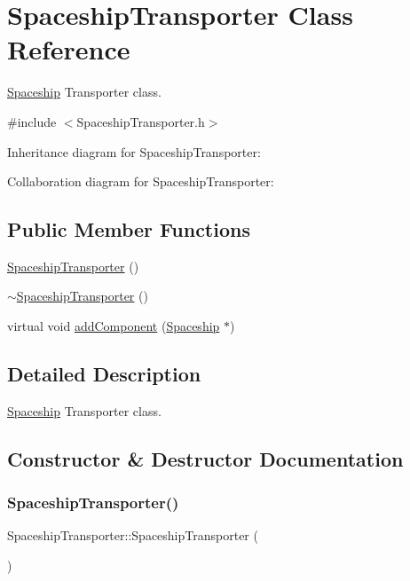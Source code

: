 \hypertarget{classSpaceshipTransporter}{}\section{Spaceship\+Transporter Class Reference}
\label{classSpaceshipTransporter}


\hyperlink{classSpaceship}{Spaceship} Transporter class.  




{\ttfamily \#include $<$Spaceship\+Transporter.\+h$>$}



Inheritance diagram for Spaceship\+Transporter\+:


Collaboration diagram for Spaceship\+Transporter\+:
\subsection*{Public Member Functions}
\begin{DoxyCompactItemize}
\item 
\hyperlink{classSpaceshipTransporter_a4478bc1ce68fb2306fb31849123b3eae}{Spaceship\+Transporter} ()
\item 
\hyperlink{classSpaceshipTransporter_a58a77ccda8effc3cfdb071c8ffa40929}{$\sim$\+Spaceship\+Transporter} ()
\item 
virtual void \hyperlink{classSpaceshipTransporter_a3e7646b5937a9967885cd3034a2f5637}{add\+Component} (\hyperlink{classSpaceship}{Spaceship} $\ast$)
\end{DoxyCompactItemize}


\subsection{Detailed Description}
\hyperlink{classSpaceship}{Spaceship} Transporter class. 

\subsection{Constructor \& Destructor Documentation}
\mbox{\label{classSpaceshipTransporter_a4478bc1ce68fb2306fb31849123b3eae}} 
\subsubsection{\texorpdfstring{Spaceship\+Transporter()}{SpaceshipTransporter()}}
{\footnotesize\ttfamily Spaceship\+Transporter\+::\+Spaceship\+Transporter (\begin{DoxyParamCaption}{ }\end{DoxyParamCaption})\hspace{0.3cm}{\ttfamily [inline]}}

